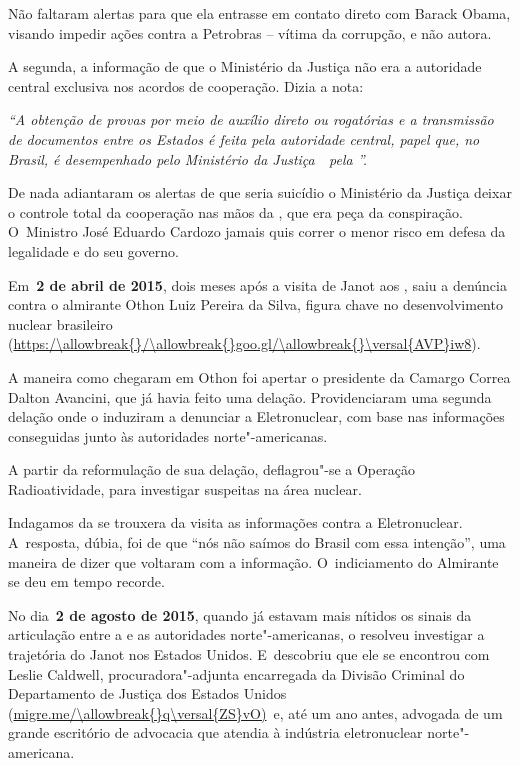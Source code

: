 Não faltaram alertas para que ela entrasse em contato direto com Barack
Obama, visando impedir ações contra a Petrobras -- vítima da corrupção,
e não autora.

A segunda, a informação de que o Ministério da Justiça não era a
autoridade central exclusiva nos acordos de cooperação. Dizia a nota:

\emph{``A obtenção de provas por meio de auxílio direto ou rogatórias e
a transmissão de documentos entre os Estados é feita pela autoridade
central, papel que, no Brasil, é desempenhado pelo Ministério da
Justiça~\textbf{}~pela ''.}

De nada adiantaram os alertas de que seria suicídio o Ministério da
Justiça deixar o controle total da cooperação nas mãos da , que era
peça da conspiração. O~Ministro José Eduardo Cardozo jamais quis correr
o menor risco em defesa da legalidade e do seu governo.

Em~\textbf{2 de abril de 2015}, dois meses após a visita de Janot aos
, saiu a denúncia contra o almirante Othon Luiz Pereira da Silva,
figura chave no desenvolvimento nuclear brasileiro
(\url{https:/\allowbreak{}/\allowbreak{}goo.gl/\allowbreak{}\versal{AVP}iw8}).

A maneira como chegaram em Othon foi apertar o presidente da Camargo
Correa Dalton Avancini, que já havia feito uma delação. Providenciaram
uma segunda delação onde o induziram a denunciar a Eletronuclear, com
base nas informações conseguidas junto às autoridades norte"-americanas.

A partir da reformulação de sua delação, deflagrou"-se a Operação
Radioatividade, para investigar suspeitas na área nuclear.

Indagamos da  se trouxera da visita as informações contra a
Eletronuclear. A~resposta, dúbia, foi de que ``nós não saímos do Brasil
com essa intenção'', uma maneira de dizer que voltaram com a informação.
O~indiciamento do Almirante se deu em tempo recorde.

No dia~\textbf{2 de agosto de 2015}, quando já estavam mais nítidos os
sinais da articulação entre a  e as autoridades norte"-americanas, o
 resolveu investigar a trajetória do  Janot nos Estados Unidos. E~descobriu que ele se encontrou com Leslie Caldwell, procuradora"-adjunta
encarregada da Divisão Criminal do Departamento de Justiça dos Estados
Unidos (\url{migre.me/\allowbreak{}q\versal{ZS}vO)}~e, até um ano antes, advogada de um
grande escritório de advocacia que atendia à indústria eletronuclear
norte"-americana.

